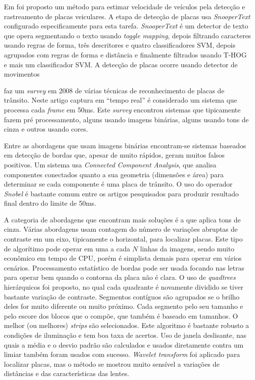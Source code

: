 Em  foi proposto um método para estimar velocidade de
veículos pela detecção e rastreamento de placas veiculares. A etapa de detecção
de placas usa \emph{SnooperText} \cite{minetto.10.icip} configurado
especificamente para esta tarefa. \emph{SnooperText} é um detector de texto
que opera segmentando o texto usando \emph{toggle mapping}, depois filtrando
caracteres usando regras de forma, três descritores e quatro classificadores
SVM, depois agrupados com regras de forma e distância e finalmente
filtrados usando T-HOG e mais um classificador SVM. A detecção de placas ocorre
usando detector de movimentos

 faz um \emph{survey} em 2008 de
várias técnicas de reconhecimento de placas de trânsito. Neste artigo
captura em ``tempo real'' é considerado um sistema que processa cada
\emph{frame} em 50ms. Este \emph{survey} encontrou sistemas 
que tipicamente fazem pré processamento, alguns usando imagens binárias,
alguns usando tons de cinza e outros usando cores.

Entre as abordagens que usam imagens binárias encontram-se sistemas baseados em
detecção de bordas que, apesar de muito rápidos, geram
muitos falsos positivos. Um sistema usa \emph{Connected Component Analysis},
que analisa componentes conectados quanto a sua geometria (dimensões e
área) para determinar se cada componente é uma placa de trânsito. O uso
do operador \emph{Snobel} é bastante comum entre os artigos pesquisados para
produzir resultado final dentro do limite de 50ms.

A categoria de abordagens que encontram mais soluções é a que aplica tons de
cinza. Várias abordagens usam
contagem do número de variações abruptas de contraste em um eixo,
tipicamente o horizontal, para localizar placas. Este tipo de algorítimo
pode operar em uma a cada $N$ linhas da imagens, sendo muito econômico em
tempo de CPU, porém é simplista demais para operar em vários cenários.
Processamento estatístico de bordas pode ser usada focando nas letras
para operar bem quando o contorna da placa não é clara. O uso de
\emph{quadtrees} hierárquicos foi proposto, no qual cada quadrante é novamente
dividido se tiver bastante variação de contraste. Segmentos contíguos são
agrupados se o brilho deles for muito diferente ou muito próximo. Cada
segmento pelo seu tamanho e pelo escore dos blocos que o compõe, que
também é baseado em tamanhos. O melhor (ou melhores) \emph{strips} são
selecionados. Este algoritmo é bastante robusto a condições de iluminação e
tem boa taxa de acertos. Uso de janela deslisante, nas quais a média e o
desvio padrão são calculados e usados diretamente contra um limiar
também foram usados com sucesso. \emph{Wavelet transform} foi aplicado para
localizar placas, mas o método se mostrou muito sensível a variações de
distâncias e das características das lentes.

